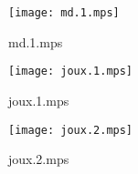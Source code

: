 \documentclass[letterpaper,10pt]{article}
\begin{document}
\begin{figure}
    \centering
    \texttt{[image: md.1.mps]}
    \caption{md.1.mps}
\end{figure}

\begin{figure}
    \centering
    \texttt{[image: joux.1.mps]}
    \caption{joux.1.mps}
\end{figure}

\begin{figure}
    \centering
    \texttt{[image: joux.2.mps]}
    \caption{joux.2.mps}
\end{figure}
\end{document}
